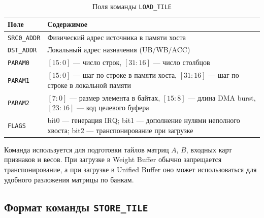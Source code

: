 \documentclass[12pt,a4paper]{article}
\begin{document}
\begin{table}[H]
    \centering
    \caption{Поля команды \texttt{LOAD\_TILE}}
    \begin{tabular}{|L{2.6cm}|L{10.1cm}|}
        \hline
        \textbf{Поле} & \textbf{Содержимое} \\
        \hline
        \texttt{SRC0\_ADDR} & Физический адрес источника в памяти хоста \\
        \hline
        \texttt{DST\_ADDR} & Локальный адрес назначения (UB/WB/ACC) \\
        \hline
        \texttt{PARAM0} & \([15:0]\) --- число строк, \([31:16]\) --- число столбцов \\
        \hline
        \texttt{PARAM1} & \([15:0]\) --- шаг по строке в памяти хоста, \([31:16]\) --- шаг по строке в локальной памяти \\
        \hline
        \texttt{PARAM2} & \([7:0]\) --- размер элемента в байтах, \([15:8]\) --- длина DMA burst, \([23:16]\) --- код целевого буфера \\
        \hline
        \texttt{FLAGS} & bit0 --- генерация IRQ; bit1 --- дополнение нулями неполного хвоста; bit2 --- транспонирование при загрузке \\
        \hline
    \end{tabular}
\end{table}

Команда используется для подготовки тайлов матриц \(A\), \(B\), входных карт признаков и весов. При загрузке в Weight Buffer обычно запрещается транспонирование, а при загрузке в Unified Buffer оно может использоваться для удобного разложения матрицы по банкам.

\subsection{Формат команды \texttt{STORE\_TILE}}
\end{document}
